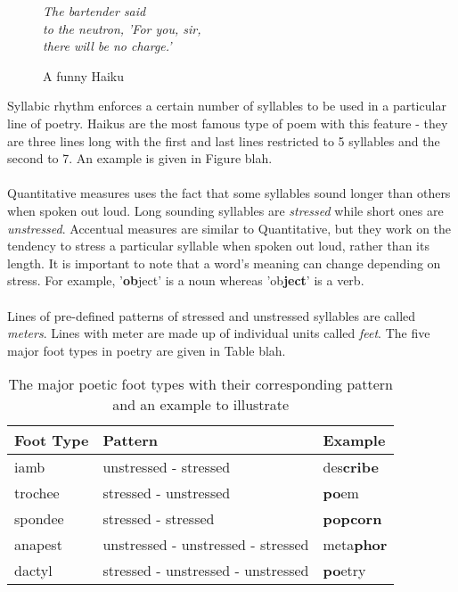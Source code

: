 \begin{figure}[h!]
\centering
\textit{
The bartender said\\
to the neutron, 'For you, sir,\\
there will be no charge.'\\
}
\caption{A funny Haiku}
\end{figure}

Syllabic rhythm enforces a certain number of syllables to be used in a particular line of poetry. Haikus are the most famous type of poem with this feature - they are three lines long with the first and last lines restricted to 5 syllables and the second to 7. An example is given in Figure blah.
\\\\
Quantitative measures uses the fact that some syllables sound longer than others when spoken out loud. Long sounding syllables are \textit{stressed} while short ones are \textit{unstressed}. Accentual measures are similar to Quantitative, but they work on the tendency to stress a particular syllable when spoken out loud, rather than its length. It is important to note that a word's meaning can change depending on stress. For example, '\textbf{ob}ject' is a noun whereas 'ob\textbf{ject}' is a verb.
\\\\
Lines of pre-defined patterns of stressed and unstressed syllables are called \textit{meters}. Lines with meter are made up of individual units called \textit{feet}. The five major foot types in poetry are given in Table blah.

\begin{table}[h!]
\centering
    \begin{tabular}{|l|l|l|}
    \hline
    Foot Type & Pattern                            & Example  \\ \hline
    iamb      & unstressed - stressed              & des\textbf{cribe} \\ \hline
    trochee   & stressed - unstressed              & \textbf{po}em     \\ \hline
    spondee   & stressed - stressed                & \textbf{popcorn}  \\ \hline
    anapest   & unstressed - unstressed - stressed & meta\textbf{phor} \\ \hline
    dactyl    & stressed - unstressed - unstressed & \textbf{po}etry   \\ \hline
    \end{tabular}
\caption{The major poetic foot types with their corresponding pattern and an example to illustrate}
\end{table}


